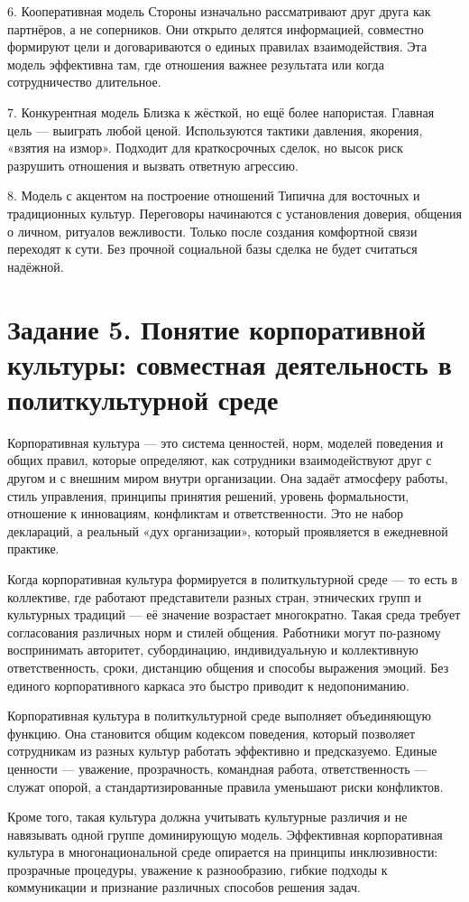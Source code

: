 \documentclass[14pt,a4paper]{extarticle}
\begin{document}
\begin{sloppypar}
    6. Кооперативная модель Стороны изначально рассматривают друг друга как
    партнёров, а не соперников. Они открыто делятся информацией, совместно
    формируют цели и договариваются о единых правилах взаимодействия. Эта
    модель эффективна там, где отношения важнее результата или когда
    сотрудничество длительное.

    7. Конкурентная модель Близка к жёсткой, но ещё более напористая. Главная
    цель — выиграть любой ценой. Используются тактики давления, якорения,
    «взятия на измор». Подходит для краткосрочных сделок, но высок риск
    разрушить отношения и вызвать ответную агрессию.

    8. Модель с акцентом на построение отношений Типична для восточных и
    традиционных культур. Переговоры начинаются с установления доверия, общения
    о личном, ритуалов вежливости. Только после создания комфортной связи
    переходят к сути. Без прочной социальной базы сделка не будет считаться
    надёжной.
\end{sloppypar}

\section{Задание 5. Понятие корпоративной культуры: совместная деятельность в политкультурной среде}
\begin{sloppypar}
Корпоративная культура — это система ценностей, норм, моделей поведения и общих
    правил, которые определяют, как сотрудники взаимодействуют друг с другом и
    с внешним миром внутри организации. Она задаёт атмосферу работы, стиль
    управления, принципы принятия решений, уровень формальности, отношение к
    инновациям, конфликтам и ответственности. Это не набор деклараций, а
    реальный «дух организации», который проявляется в ежедневной практике.

    Когда корпоративная культура формируется в политкультурной среде — то есть
    в коллективе, где работают представители разных стран, этнических групп и
    культурных традиций — её значение возрастает многократно. Такая среда
    требует согласования различных норм и стилей общения. Работники могут
    по-разному воспринимать авторитет, субординацию, индивидуальную и
    коллективную ответственность, сроки, дистанцию общения и способы выражения
    эмоций. Без единого корпоративного каркаса это быстро приводит к
    недопониманию.

    Корпоративная культура в политкультурной среде выполняет объединяющую
    функцию. Она становится общим кодексом поведения, который позволяет
    сотрудникам из разных культур работать эффективно и предсказуемо. Единые
    ценности — уважение, прозрачность, командная работа, ответственность —
    служат опорой, а стандартизированные правила уменьшают риски конфликтов.

    Кроме того, такая культура должна учитывать культурные различия и не
    навязывать одной группе доминирующую модель. Эффективная корпоративная
    культура в многонациональной среде опирается на принципы инклюзивности:
    прозрачные процедуры, уважение к разнообразию, гибкие подходы к
    коммуникации и признание различных способов решения задач.
\end{sloppypar}
\end{document}
